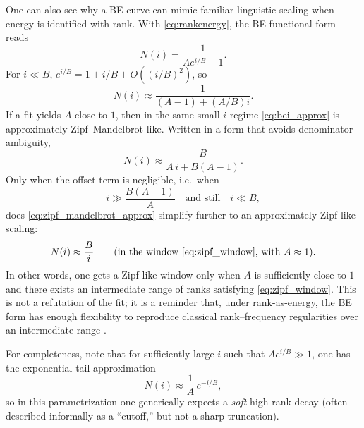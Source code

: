 \documentclass[11pt,a4paper]{article}
\begin{document}
One can also see why a BE curve can mimic familiar linguistic scaling when energy is identified with rank. With \eqref{eq:rankenergy}, the BE functional form reads
\begin{equation}
N(i)=\frac{1}{A e^{i/B}-1}.
\label{eq:bei}
\end{equation}
For $i\ll B$, $e^{i/B}=1+i/B+O((i/B)^2)$, so
\begin{equation}
N(i)\approx \frac{1}{(A-1) + (A/B)i}.
\label{eq:bei_approx}
\end{equation}
If a fit yields $A$ close to $1$, then in the same small-$i$ regime \eqref{eq:bei_approx} is approximately Zipf--Mandelbrot-like. Written in a form that avoids denominator ambiguity,
\begin{equation}
N(i)\approx \frac{B}{A\,i + B(A-1)}.
\label{eq:zipf_mandelbrot_approx}
\end{equation}
Only when the offset term is negligible, i.e.\ when
\begin{equation}
i \gg \frac{B(A-1)}{A}
\quad\text{and still}\quad i\ll B,
\label{eq:zipf_window}
\end{equation}
does \eqref{eq:zipf_mandelbrot_approx} simplify further to an approximately Zipf-like scaling:
\begin{equation}
N(i)\approx \frac{B}{i}
\qquad \text{(in the window \eqref{eq:zipf_window}, with $A\approx 1$).}
\label{eq:zipf_asympt}
\end{equation}
In other words, one gets a Zipf-like window only when $A$ is sufficiently close to $1$ and there exists an intermediate range of ranks satisfying \eqref{eq:zipf_window}. This is not a refutation of the fit; it is a reminder that, under rank-as-energy, the BE form has enough flexibility to reproduce classical rank--frequency regularities over an intermediate range \citep{Zipf1935,Mandelbrot1953}.

For completeness, note that for sufficiently large $i$ such that $A e^{i/B}\gg 1$, one has the exponential-tail approximation
\begin{equation}
N(i)\approx \frac{1}{A}\,e^{-i/B},
\label{eq:bei_tail}
\end{equation}
so in this parametrization one generically expects a \emph{soft} high-rank decay (often described informally as a ``cutoff,'' but not a sharp truncation).
\end{document}
